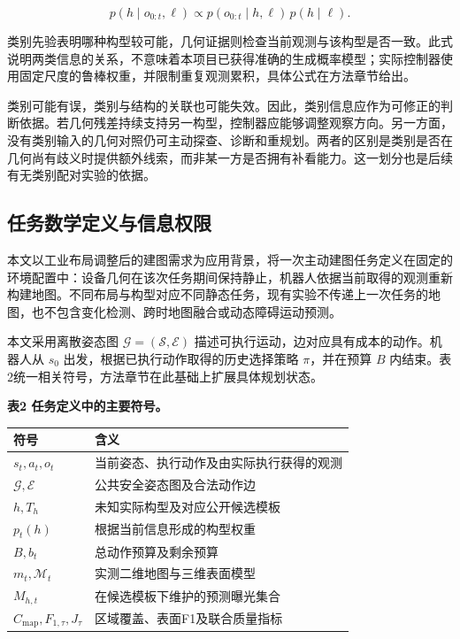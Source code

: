 \documentclass[11pt,a4paper]{article}
\newlength{\ReviewTableWidth}
\numberwithin{equation}{section}
\begin{document}
\begin{equation}
p(h\mid o_{0:t},\ell)
\propto p(o_{0:t}\mid h,\ell)\,p(h\mid\ell).
\end{equation}

类别先验表明哪种构型较可能，几何证据则检查当前观测与该构型是否一致。此式说明两类信息的关系，不意味着本项目已获得准确的生成概率模型；实际控制器使用固定尺度的鲁棒权重，并限制重复观测累积，具体公式在方法章节给出。

类别可能有误，类别与结构的关联也可能失效。因此，类别信息应作为可修正的判断依据。若几何残差持续支持另一构型，控制器应能够调整观察方向。另一方面，没有类别输入的几何对照仍可主动探查、诊断和重规划。两者的区别是类别是否在几何尚有歧义时提供额外线索，而非某一方是否拥有补看能力。这一划分也是后续有无类别配对实验的依据。

\hypertarget{ux4efbux52a1ux6570ux5b66ux5b9aux4e49ux4e0eux4fe1ux606fux6743ux9650}{%
\subsection{任务数学定义与信息权限}\label{ux4efbux52a1ux6570ux5b66ux5b9aux4e49ux4e0eux4fe1ux606fux6743ux9650}}

本文以工业布局调整后的建图需求为应用背景，将一次主动建图任务定义在固定的环境配置中：设备几何在该次任务期间保持静止，机器人依据当前取得的观测重新构建地图。不同布局与构型对应不同静态任务，现有实验不传递上一次任务的地图，也不包含变化检测、跨时地图融合或动态障碍运动预测。

本文采用离散姿态图 \(\mathcal G=(\mathcal S,\mathcal E)\) 描述可执行运动，边对应具有成本的动作。机器人从 \(s_0\) 出发，根据已执行动作取得的历史选择策略 \(\pi\)，并在预算 \(B\) 内结束。表2统一相关符号，方法章节在此基础上扩展具体规划状态。

\par\noindent\begin{minipage}{\linewidth}
\textbf{表2 任务定义中的主要符号。}

\begin{center}
\small
\setlength{\tabcolsep}{4pt}
\setlength{\ReviewTableWidth}{\dimexpr\linewidth-2\tabcolsep\relax}
\begin{tabular}{@{}>{\raggedright\arraybackslash}p{0.24\ReviewTableWidth} >{\raggedright\arraybackslash}p{0.76\ReviewTableWidth}@{}}
\toprule
符号 & 含义 \\
\midrule
\(s_t,a_t,o_t\) & 当前姿态、执行动作及由实际执行获得的观测 \\
\(\mathcal G,\mathcal E\) & 公共安全姿态图及合法动作边 \\
\(h,T_h\) & 未知实际构型及对应公开候选模板 \\
\(p_t(h)\) & 根据当前信息形成的构型权重 \\
\(B,b_t\) & 总动作预算及剩余预算 \\
\(m_t,\mathcal M_t\) & 实测二维地图与三维表面模型 \\
\(M_{h,t}\) & 在候选模板下维护的预测曝光集合 \\
\(C_{\mathrm{map}},F_{1,\tau},J_\tau\) & 区域覆盖、表面F1及联合质量指标 \\
\bottomrule
\end{tabular}
\end{center}
\end{minipage}
\end{document}
